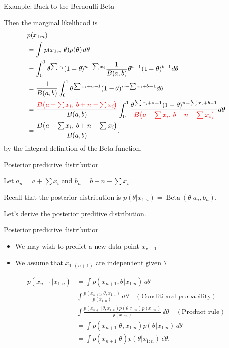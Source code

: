 \documentclass[
  ignorenonframetext,
]{beamer}
\providecommand{\tightlist}{%
  \setlength{\itemsep}{0pt}\setlength{\parskip}{0pt}}
\DeclareMathOperator*{\Beta}{Beta}
\begin{document}
\begin{frame}{Example: Back to the Bernoulli-Beta}
\protect\hypertarget{example-back-to-the-bernoulli-beta-1}{}

Then the marginal likelihood is \[
\begin{aligned}
&p(x_{1:n}) \\
&= \int p(x_{1:n}|\theta) p(\theta) \,d\theta\\
& = \int_0^1\theta^{\sum x_i}(1-\theta)^{n-\sum x_i}\frac{1}{B(a,b)}\theta^{a-1}(1-\theta)^{b-1} d\theta\\
& = \frac{1}{B(a,b)}\int_0^1\theta^{\sum x_i+a-1}(1-\theta)^{n-\sum x_i+b-1} 
d\theta\\
& = \frac{\textcolor{red}{B\big(a +\sum x_i,\, b + n-\sum x_i\big)}}{B(a,b)}\int_0^1 \frac{\theta^{\sum x_i+a-1}(1-\theta)^{n-\sum x_i+b-1}}{\textcolor{red}{B\big(a +\sum x_i,\, b + n-\sum x_i\big)}}
d\theta\\
& =\frac{B\big(a +\sum x_i,\, b + n-\sum x_i\big)}{B(a,b)},
\end{aligned}
\] by the integral definition of the Beta function.

\end{frame}

\begin{frame}{Posterior predictive distribution}
\protect\hypertarget{posterior-predictive-distribution}{}

Let \(a_n = a +\sum x_i\) and \(b_n = b + n-\sum x_i.\)

Recall that the posterior distribution is
\(p(\theta|x_{1:n}) = \Beta(\theta|a_n,b_n).\)

Let's derive the posterior preditive distribution.

\end{frame}

\begin{frame}{Posterior predictive distribution}
\protect\hypertarget{posterior-predictive-distribution-1}{}

\begin{itemize}
\tightlist
\item
  We may wish to predict a new data point \(x_{n+1}\)
\item
  We assume that \(x_{1:(n+1)}\) are independent given \(\theta\)
\end{itemize}

\[
\begin{aligned}
p(x_{n+1}|x_{1:n}) &= \int p(x_{n+1},\theta|x_{1:n})\,d\theta\\
& \int \frac{p(x_{n+1},\theta, x_{1:n})}{p(x_{1:n})}\,d\theta \quad (\text{Conditional probability})\\
& \int \frac{p(x_{n+1}|\theta,x_{1:n})p(\theta|x_{1:n})p(x_{1:n})}{p(x_{1:n})}\,d\theta \quad (\text{Product rule})\\
&= \int p(x_{n+1}|\theta,x_{1:n}) p(\theta|x_{1:n})\,d\theta \\
& = \int p(x_{n+1}|\theta) p(\theta|x_{1:n})\,d\theta.
\end{aligned}
\]

\end{frame}
\end{document}
